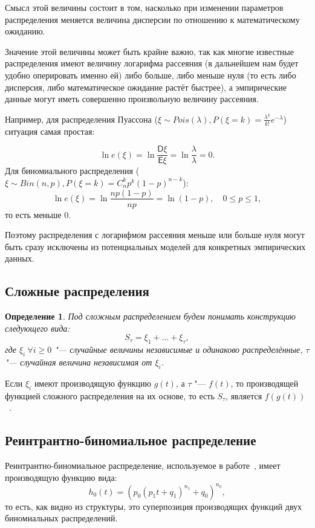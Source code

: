 \documentclass[12pt, specialist, subf, substylefile = spbu_report.rtx]{disser}
\newtheorem{define}{Определение}
\begin{document}
	Смысл этой величины состоит в том, насколько при изменении параметров распределения меняется величина дисперсии по отношению к математическому ожиданию.
	
	Значение этой величины может быть крайне важно, так как многие известные распределения имеют величину логарифма рассеяния (в дальнейшем нам будет удобно оперировать именно ей) либо больше, либо меньше нуля (то есть либо дисперсия, либо математическое ожидание растёт быстрее), а эмпирические данные могут иметь совершенно произвольную величину рассеяния.
	
	Например, для распределения Пуассона ($ \xi \sim Pois(\lambda), P (\xi = k) = \frac {\lambda ^ k} {k !} e ^{-\lambda} $) ситуация самая простая:
	
	\[
		\ln e (\xi) = \ln \frac {\mathsf{D} \xi} {\mathsf{E} \xi} = \ln \frac \lambda \lambda = 0.
	\]
	Для биномиального распределения ($ \xi \sim Bin(n, p), P (\xi = k) = C ^k _n p ^k (1 - p) ^{n - k} $):
	\[
		\ln e (\xi) = \ln \frac {n p (1 - p)} {np} = \ln (1 - p), \quad 0 \leqslant p \leqslant 1,
	\]
	то есть меньше $ 0 $.
	
	Поэтому распределения с логарифмом рассеяния меньше или больше нуля могут быть сразу исключены из потенциальных моделей для конкретных эмпирических данных.
	
	\subsection{Сложные распределения}
	
	\begin{define}
		Под сложным распределением будем понимать конструкцию следующего вида:
		\[
			S _\tau = \xi _1 + \dots + \xi _\tau,
		\]
		где $\xi _i~ \forall i \geqslant 0$ "--- случайные величины независимые и одинаково распределённые, $\tau$ "--- случайная величина независимая от $\xi _i$.
		\label{def:harddistr}
	\end{define}

	Если $\xi _i$ имеют производящую функцию $g(t)$, а $\tau$ "---  $f(t)$, то производящей функцией сложного распределения на их основе, то есть $S _\tau$, является $f(g(t))$~\cite{bib:feller1952}.
	
	\subsection{Реинтрантно-биномиальное распределение}
	
	Реинтрантно-биномиальное распределение, используемое в работе~\cite{bib:alexeeva2008}, имеет производящую функцию вида:
	\[
		h _0 (t) = (p _0(p _1 t + q _1) ^{n _1} + q _0) ^{n _0},
	\]
	то есть, как видно из структуры, это суперпозиция производящих функций двух биномиальных распределений.
	
\end{document}
